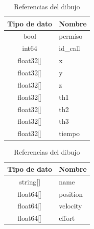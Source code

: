         \begingroup
            \renewcommand{\arraystretch}{1.5}
            \begin{table}[H]
                \centering
                \begin{tabular}{c m{2.5cm}}
                   \hline                   
                   \textbf{Tipo de dato}  & \textbf{Nombre}    \\\hline \hline 
                   bool &  permiso
                   \\\hline
                   int64 &  id\_call
                   \\\hline
                   float32[] &  x
                   \\\hline
                   float32[] &  y
                   \\\hline
                   float32[] &  z
                   \\\hline
                   float32[] &  th1
                   \\\hline
                   float32[] &  th2
                   \\\hline
                   float32[] &  th3
                   \\\hline
                   float32[] &  tiempo
                      \\\hline                   
                \end{tabular}
                \caption{Referencias del dibujo}
                \label{tab:cap6_rviz_1_msg}
            \end{table}
        \endgroup
        
        \begingroup
            \renewcommand{\arraystretch}{1.5}
            \begin{table}[H]
                \centering
                \begin{tabular}{c m{2.5cm}}
                   \hline                   
                   \textbf{Tipo de dato}  & \textbf{Nombre}    \\\hline \hline 
                    string[]  & name
                   \\\hline
                    float64[]  & position
                   \\\hline
                    float64[]  & velocity
                   \\\hline
                    float64[] &  effort
                    \\\hline                   
                \end{tabular}
                \caption{Referencias del dibujo}
                \label{tab:cap6_rviz_2_msg}
            \end{table}
        \endgroup

